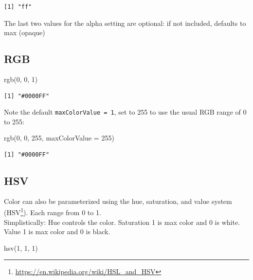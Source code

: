 \documentclass[
]{book}
\newenvironment{Shaded}{\begin{snugshade}}{\end{snugshade}}
\newcommand{\AttributeTok}[1]{\textcolor[rgb]{0.77,0.63,0.00}{#1}}
\newcommand{\DecValTok}[1]{\textcolor[rgb]{0.00,0.00,0.81}{#1}}
\newcommand{\FunctionTok}[1]{\textcolor[rgb]{0.00,0.00,0.00}{#1}}
\newcommand{\NormalTok}[1]{#1}
\renewcommand{\href}[2]{#2\footnote{\url{#1}}}
\begin{document}
\begin{verbatim}
[1] "ff"
\end{verbatim}

The last two values for the alpha setting are optional: if not included, defaults to max (opaque)

\hypertarget{rgb}{%
\subsection{RGB}\label{rgb}}

\begin{Shaded}
\begin{Highlighting}[]
\FunctionTok{rgb}\NormalTok{(}\DecValTok{0}\NormalTok{, }\DecValTok{0}\NormalTok{, }\DecValTok{1}\NormalTok{)}
\end{Highlighting}
\end{Shaded}

\begin{verbatim}
[1] "#0000FF"
\end{verbatim}

Note the default \texttt{maxColorValue\ =\ 1}, set to 255 to use the usual RGB range of 0 to 255:

\begin{Shaded}
\begin{Highlighting}[]
\FunctionTok{rgb}\NormalTok{(}\DecValTok{0}\NormalTok{, }\DecValTok{0}\NormalTok{, }\DecValTok{255}\NormalTok{, }\AttributeTok{maxColorValue =} \DecValTok{255}\NormalTok{)}
\end{Highlighting}
\end{Shaded}

\begin{verbatim}
[1] "#0000FF"
\end{verbatim}

\hypertarget{hsv}{%
\subsection{HSV}\label{hsv}}

Color can also be parameterized using the hue, saturation, and value system (\href{https://en.wikipedia.org/wiki/HSL_and_HSV}{HSV}). Each range from 0 to 1.\\
Simplistically: Hue controls the color. Saturation 1 is max color and 0 is white. Value 1 is max color and 0 is black.

\begin{Shaded}
\begin{Highlighting}[]
\FunctionTok{hsv}\NormalTok{(}\DecValTok{1}\NormalTok{, }\DecValTok{1}\NormalTok{, }\DecValTok{1}\NormalTok{)}
\end{Highlighting}
\end{Shaded}
\end{document}
